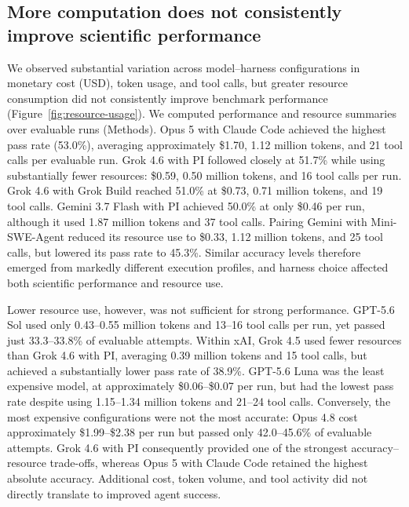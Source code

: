 \documentclass[10pt,letterpaper]{article}
\begin{document}
\subsection{More computation does not consistently improve scientific performance}
We observed substantial variation across model–harness configurations in monetary cost (USD), token usage, and tool calls, but greater resource consumption did not consistently improve benchmark performance (Figure~\ref{fig:resource-usage}). We computed performance and resource summaries over evaluable runs (Methods). Opus 5 with Claude Code achieved the highest pass rate (53.0\%), averaging approximately \$1.70, 1.12 million tokens, and 21 tool calls per evaluable run. Grok 4.6 with PI followed closely at 51.7\% while using substantially fewer resources: \$0.59, 0.50 million tokens, and 16 tool calls per run. Grok 4.6 with Grok Build reached 51.0\% at \$0.73, 0.71 million tokens, and 19 tool calls. Gemini 3.7 Flash with PI achieved 50.0\% at only \$0.46 per run, although it used 1.87 million tokens and 37 tool calls. Pairing Gemini with Mini-SWE-Agent reduced its resource use to \$0.33, 1.12 million tokens, and 25 tool calls, but lowered its pass rate to 45.3\%. Similar accuracy levels therefore emerged from markedly different execution profiles, and harness choice affected both scientific performance and resource use.
\par
Lower resource use, however, was not sufficient for strong performance. GPT-5.6 Sol used only 0.43–0.55 million tokens and 13–16 tool calls per run, yet passed just 33.3–33.8\% of evaluable attempts. Within xAI, Grok 4.5 used fewer resources than Grok 4.6 with PI, averaging 0.39 million tokens and 15 tool calls, but achieved a substantially lower pass rate of 38.9\%. GPT-5.6 Luna was the least expensive model, at approximately \$0.06–\$0.07 per run, but had the lowest pass rate despite using 1.15–1.34 million tokens and 21–24 tool calls. Conversely, the most expensive configurations were not the most accurate: Opus 4.8 cost approximately \$1.99–\$2.38 per run but passed only 42.0–45.6\% of evaluable attempts. Grok 4.6 with PI consequently provided one of the strongest accuracy–resource trade-offs, whereas Opus 5 with Claude Code retained the highest absolute accuracy. Additional cost, token volume, and tool activity did not directly translate to improved agent success.
\par
\end{document}

